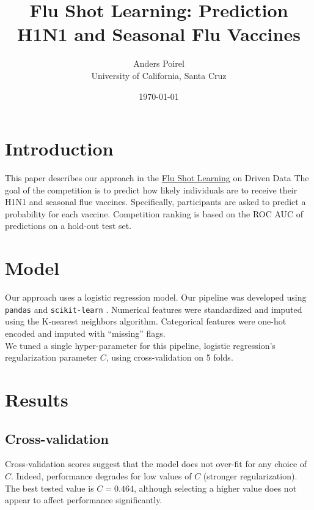 \documentclass{article}[12pt]
\title{Flu Shot Learning: Prediction H1N1 and Seasonal Flu Vaccines}
\author{Anders Poirel \\ University of California, Santa Cruz}
\date{\today}
\begin{document}
    
\maketitle

\section{Introduction}

This paper describes our approach in 
the \href{https://www.drivendata.org/competitions/66/flu-shot-learning/}{Flu Shot Learning}
on Driven Data \cite{driven-data}
The goal of the competition is to predict how likely individuals are to receive their 
H1N1 and seasonal flue vaccines. Specifically, participants are asked to predict a 
probability for each vaccine. Competition ranking is based on the ROC AUC of predictions 
on a hold-out test set.

\section{Model}

Our approach uses a logistic regression model. Our pipeline was developed using
\verb|pandas| \cite{scikit-learn} and \verb|scikit-learn| \cite{scikit-learn}. 
Numerical features were standardized and imputed using the K-nearest neighbors
algorithm. Categorical features were one-hot encoded and imputed with ``missing''
flags. \\
We tuned a single hyper-parameter for this pipeline, logistic regression's regularization
parameter $C$, using cross-validation on 5 folds. 

\section{Results}

\subsection{Cross-validation}

Cross-validation scores suggest that the model does not over-fit for any choice
of $C$. Indeed, performance degrades for low values of $C$ (stronger regularization).
The best tested value is $C = 0.464$, although selecting a higher value does not 
appear to affect performance significantly.

\end{document}

